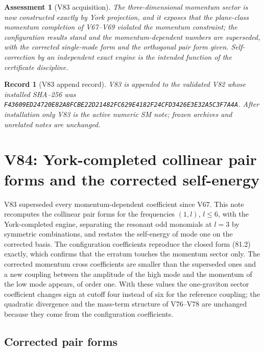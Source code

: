 \documentclass[11pt]{article}
\newtheorem{assessment}[theorem]{Assessment}
\newtheorem{record}[theorem]{Record}
\theoremstyle{remark}
\begin{document}
\begin{assessment}[V83 acquisition]
\label{ass:v19v83}
The three-dimensional momentum sector is now constructed exactly by
York projection, and it exposes that the plane-class momentum
completion of V67--V69 violated the momentum constraint; the
configuration results stand and the momentum-dependent numbers are
superseded, with the corrected single-mode form and the orthogonal
pair form given.  Self-correction by an independent exact engine is
the intended function of the certificate discipline.
\end{assessment}

\begin{record}[V83 append record]
\label{rec:v19v83}
V83 is appended to the validated V82 whose installed SHA--256 was
\texttt{F43609ED24720E82A8FCBE22D21482FC629E4182F24CFD3426E3E32A5C3F7A4A}.
After installation only V83 is the active numeric SM note; frozen
archives and unrelated notes are unchanged.
\end{record}


\section{V84: York-completed collinear pair forms and the corrected self-energy}
\label{sec:v19v84}

V83 superseded every momentum-dependent coefficient since V67.  This
note recomputes the collinear pair forms for the frequencies
\((1,l)\), \(l\leq6\), with the York-completed engine, separating the
resonant odd monomials at \(l=3\) by symmetric combinations, and
restates the self-energy of mode one on the corrected basis.  The
configuration coefficients reproduce the closed form (81.2) exactly,
which confirms that the erratum touches the momentum sector only.  The
corrected momentum cross coefficients are smaller than the superseded
ones and a new coupling between the amplitude of the high mode and the
momentum of the low mode appears, of order one.  With these values the
one-graviton sector coefficient changes sign at cutoff four instead of
six for the reference coupling; the quadratic divergence and the
mass-term structure of V76--V78 are unchanged because they come from
the configuration coefficients.

\subsection{Corrected pair forms}
\end{document}

